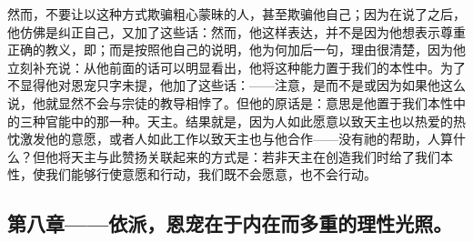 然而，不要让以这种方式欺骗粗心蒙昧的人，甚至欺骗他自己；因为在说了之后，他仿佛是纠正自己，又加了这些话：然而，他这样表达，并不是因为他想表示尊重正确的教义，即；而是按照他自己的说明，他为何加后一句，理由很清楚，因为他立刻补充说：从他前面的话可以明显看出，他将这种能力置于我们的本性中。为了不显得他对恩宠只字未提，他加了这些话：——注意，是而不是或因为如果他这么说，他就显然不会与宗徒的教导相悖了。但他的原话是：意思是他置于我们本性中的三种官能中的那一种。天主。结果就是，因为人如此愿意以致天主也以热爱的热忱激发他的意愿，或者人如此工作以致天主也与他合作——没有祂的帮助，人算什么？但他将天主与此赞扬关联起来的方式是：若非天主在创造我们时给了我们本性，使我们能够行使意愿和行动，我们既不会愿意，也不会行动。\par


\subsection{第八章——依派，恩宠在于内在而多重的理性光照。}

